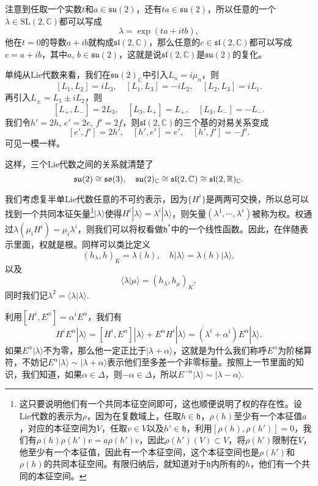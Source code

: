 \documentclass[9pt]{extarticle}
\newcommand{\cc}{\mathbb{C}}
\begin{document}
注意到任取一个实数$t$和$a\in\mathfrak{su}(2)$，还有$ta \in\mathfrak{su}(2)$，所以任意的一个$\lambda \in \mathrm{SL}(2,\cc)$都可以写成
\[
	\lambda=\exp(ta+itb),
\]
他在$t=0$的导数$a+ib$就构成$\mathfrak{sl}(2,\cc)$，那么任意的$c\in \mathfrak{sl}(2,\cc)$都可以写成$c=a+ib$，其中$a$, $b\in\mathfrak{su}(2)$，这就是说$\mathfrak{sl}(2,\cc)$是$\mathfrak{su}(2)$的复化。

单纯从Lie代数来看，我们在$\mathfrak{su}(2)_\cc$中引入$L_n=i\mu_n$，则
\[
	[L_1,L_2]=iL_3,\quad [L_1,L_3]=-iL_2,\quad [L_2,L_3]=iL_1.
\]
再引入$L_\pm=L_1\pm iL_2$，则
\[
	[L_+,L_-]=2L_3,\quad [L_3,L_+]=L_+,\quad [L_3,L_-]=-L_-.
\]
我们令$h'=2h$, $e'=2e$, $f'=2f$，则$\mathfrak{sl}(2,\cc)$的三个基的对易关系变成
\[
[e',f']=2h',\quad[h',e']=e',\quad[h',f']=-f'.
\]
可见一模一样。

这样，三个Lie代数之间的关系就清楚了
\[
	\mathfrak{su}(2)\cong\mathfrak{so}(3),\quad \mathfrak{su}(2)_\cc\cong \mathfrak{sl}(2,\mathbb{C}) \cong\mathfrak{sl}(2,\rr)_\cc.
\]

\para 我们考虑复半单Lie代数任意的不可约表示，因为$\{H^i\}$是两两可交换，所以总可以找到一个共同本征矢量\footnote{这只要说明他们有一个共同本征空间即可，这也顺便说明了权的存在性。设Lie代数的表示为$\rho$，因为在复数域上，任取$h\in\mathfrak{h}$，$\rho(h)$至少有一个本征值$a$，对应的本征空间为$V$，任取$v\in V$以及$h'\in \mathfrak{h}$，利用$[\rho(h),\rho(h')]=0$，我们有$\rho(h)\rho(h')v=a\rho(h')v$，因此$\rho(h')(V)\subset V$，将$\rho(h')$限制在$V$，他至少有一个本征值，因此有一个本征空间，这个本征空间也是$\rho(h')$和$\rho(h)$的共同本征空间。有限归纳后，就知道对于$\mathfrak{h}$内所有的$h$，他们有一个共同的本征空间。}$|\lambda\rangle$使得$H^i|\lambda\rangle=\lambda^i|\lambda\rangle$，则矢量$(\lambda^1,\cdots,\lambda^r)$被称为权。权通过$\lambda(\mu_iH^i)=\mu_i\lambda^i$，则我们可以将权看做$\mathfrak{h}^*$中的一个线性函数。因此，在伴随表示里面，权就是根。同样可以类比定义
\[
	(h_\lambda,h)_K=\lambda(h),\quad h|\lambda\rangle=\lambda(h)|\lambda\rangle,
\]
以及
\[
	\langle \lambda|\mu\rangle=(h_\lambda,h_\mu)_K,
\]
同时我们记$\lambda^2=\langle \lambda|\lambda\rangle$.

利用$[H^i,E^\alpha]=\alpha^iE^\alpha$，我们有
\[
	H^iE^\alpha|\lambda\rangle=[H^i,E^\alpha]|\lambda\rangle+E^\alpha H^i|\lambda\rangle=(\lambda^i+\alpha^i)E^\alpha |\lambda\rangle.
\]
如果$E^\alpha |\lambda\rangle$不为零，那么他一定正比于$|\lambda+\alpha\rangle$，这就是为什么我们称呼$E^\alpha$为阶梯算符，不妨记$E^\alpha |\lambda\rangle\sim |\lambda+\alpha\rangle$表示他们至多差一个非零标量。按照上一节里面的知识，我们知道，如果$\alpha\in \Delta$，则$-\alpha\in\Delta$，所以$E^{-\alpha} |\lambda\rangle\sim |\lambda-\alpha\rangle$.
\end{document}
